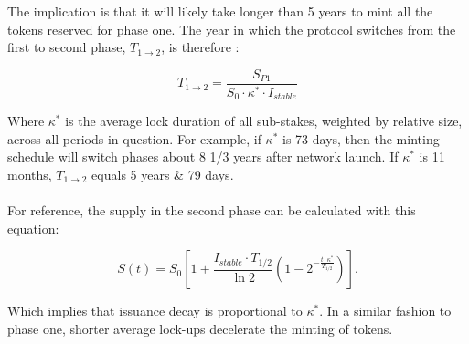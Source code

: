 \documentclass[8pt]{article}
\begin{document}
The implication is that it will likely take longer than 5 years to mint all the tokens reserved for phase one. The year in which the protocol switches from the first to second phase, $T_{1\rightarrow2}$, is therefore : 

\begin{equation}
    T_{1\rightarrow2}= \frac{S_{P1}}{S_0 \cdot \kappa^* \cdot I_{stable}}
\end{equation}

Where $\kappa^*$ is the average lock duration of all sub-stakes, weighted by relative size, across all periods in question. For example, if $\kappa^*$ is 73 days, then the minting schedule will switch phases about 8 1/3 years after network launch. If $\kappa^*$ is 11 months, $T_{1\rightarrow2}$ equals 5 years \& 79 days. 
\\\\
For reference, the supply in the second phase can be calculated with this equation: 

\begin{equation}
    S(t) = S_0 \left[1 + \frac{I_{stable} \cdot T_{1/2}}{\ln{2}}\left(1 - 2^{-\frac{t \cdot \kappa^*}{T_{1/2}}} \right) \right].
\end{equation}

Which implies that issuance decay is proportional to $\kappa^*$. In a similar fashion to phase one, shorter average lock-ups decelerate the minting of tokens. 
\end{document}
